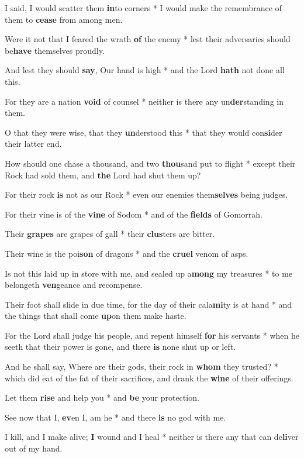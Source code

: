 \begin{multicols}{2}
	I said, I would scatter them \textbf{in}to corners * I would make the remembrance of them to \textbf{cease} from among men.
	
	Were it not that I feared the wrath \textbf{of} the enemy * lest their adversaries should be\textbf{have} themselves proudly.
	
	And lest they should \textbf{say}, Our hand is high * and the Lord \textbf{hath} not done all this.
	
	For they are a nation \textbf{void} of counsel * neither is there any un\textbf{der}standing in them.
	
	O that they were wise, that they \textbf{un}derstood this * that they would con\textbf{si}der their latter end.
	
	How should one chase a thousand, and two \textbf{thou}sand put to flight * except their Rock had sold them, and \textbf{the} Lord had shut them up?
	
	For their rock \textbf{is} not as our Rock * even our enemies them\textbf{selves} being judges.
	
	For their vine is of the \textbf{vine} of Sodom * and of the \textbf{fields} of Gomorrah.
	
	Their \textbf{grapes} are grapes of gall * their \textbf{clus}ters are bitter.
	
	Their wine is the poi\textbf{son} of dragons * and the \textbf{cruel} venom of asps.
	
	Is not this laid up in store with me, and sealed up a\textbf{mong} my treasures *  to me belongeth \textbf{ven}geance and recompense.
	
	Their foot shall slide in due time, for the day of their cala\textbf{mi}ty is at hand * and the things that shall come \textbf{up}on them make haste.
	
	For the Lord shall judge his people, and repent himself \textbf{for} his servants * when he seeth that their power is gone, and there \textbf{is} none shut up or left.
	
	And he shall say, Where are their gods, their rock in \textbf{whom} they trusted? * which did eat of the fat of their sacrifices, and drank the \textbf{wine} of their offerings.
	
	Let them \textbf{rise} and help you * and \textbf{be} your protection.
	
	See now that I, \textbf{ev}en I, am he * and there \textbf{is} no god with me.
	
	I kill, and I make alive; \textbf{I} wound and I heal * neither is there any that can de\textbf{li}ver out of my hand.
	

\end{multicols}
